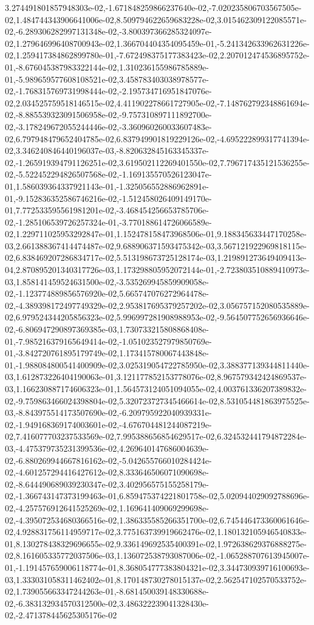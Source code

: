 3.274491801857948303e-02,-1.671848259866237640e-02,-7.020235806703567505e-02,1.484744343906641006e-02,8.509794622659683228e-02,3.015462309122085571e-02,-6.289306282997131348e-02,-3.800397366285324097e-02,1.279646996408700943e-02,1.366704404354095459e-01,-5.241342633962631226e-02,1.259417384862899780e-01,-7.672498375177383423e-02,2.207012474536895752e-01,-8.676045387983322144e-02,1.310236155986785889e-01,-5.989659577608108521e-02,3.458783403038978577e-02,-1.768315769731998444e-02,-2.195734716951847076e-02,2.034525759518146515e-02,4.411902278661727905e-02,-7.148762792348861694e-02,-8.885539323091506958e-02,-9.757310897111892700e-02,-3.178249672055244446e-02,-3.360960260033607483e-02,6.797948479652404785e-02,6.837949901819229126e-02,-4.695222899317741394e-02,3.346240846440196037e-03,-8.820632845163345337e-02,-1.265919394791126251e-02,3.619502112269401550e-02,7.796717435121536255e-02,-5.522452294826507568e-02,-1.169135570526123047e-01,1.586039364337921143e-01,-1.325056552886962891e-01,-9.152836352586746216e-02,-1.512458026409149170e-01,7.772533595561981201e-02,-3.468454256653785706e-02,-1.285106539726257324e-01,-3.770188614726066589e-02,1.229711025953292847e-01,1.152478158473968506e-01,9.188345633447170258e-03,2.661388367414474487e-02,9.688906371593475342e-03,3.567121922969818115e-02,6.838469207286834717e-02,5.513198673725128174e-03,1.219891273649409413e-04,2.870895201340317726e-03,1.173298805952072144e-01,-2.723803510889410973e-03,1.858141459524631500e-02,-3.535269945859909058e-02,-1.123774889856576920e-02,5.665747076272964478e-02,-4.389398172497749329e-02,2.953817695379257202e-02,3.056757152080535889e-02,6.979524344205856323e-02,5.996997281908988953e-02,-9.564507752656936646e-02,-6.806947290897369385e-03,1.730733215808868408e-01,-7.985216379165649414e-02,-1.051023527979850769e-01,-3.842720761895179749e-02,1.173415780067443848e-01,-1.988084800541400909e-02,3.025319054722785950e-02,3.388377139344811440e-03,1.612873226404190063e-01,3.121177852153778076e-02,8.967579342424869537e-03,1.166230887174606323e-01,1.564573124051094055e-02,4.003761336207389832e-02,-9.759863466024398804e-02,5.320723727345466614e-02,8.531054481863975525e-03,-8.843975514173507690e-02,-6.209795922040939331e-02,-1.949168369174003601e-02,-4.676704481244087219e-02,7.416077703237533569e-02,7.995388656854629517e-02,6.324532441794872284e-03,-4.475379735231399536e-02,4.269640147686004639e-02,-6.880269944667816162e-02,-5.042655766010284424e-02,-4.601257294416427612e-02,8.333646506071090698e-02,-8.644490689039230347e-02,3.402956575155258179e-02,-1.366743147373199463e-01,6.859475374221801758e-02,5.020944029092788696e-02,-4.257576912641525269e-02,1.169641409069299698e-02,-4.395072534680366516e-02,1.386335585266351700e-02,6.745446473360061646e-02,4.928831756114959717e-02,3.775163739919662476e-02,1.180132105946540833e-01,8.130278438329696655e-02,9.336149692535400391e-02,1.972638629376888275e-02,8.161605335772037506e-03,1.136072538793087006e-02,-1.065288707613945007e-01,-1.191457659006118774e-01,8.368054777383804321e-02,3.344730939716100693e-03,1.333031058311462402e-01,8.170148730278015137e-02,2.562547102570533752e-02,1.739055663347244263e-01,-8.681450039148330688e-02,-6.383132934570312500e-02,3.486322239041328430e-02,-2.471378445625305176e-02
